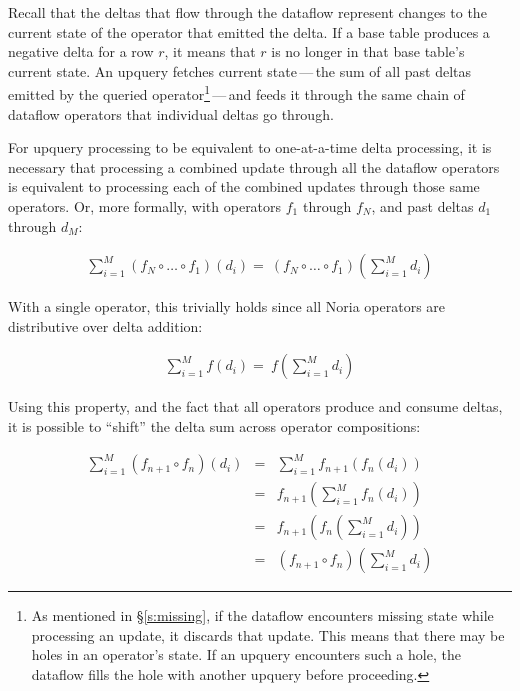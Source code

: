 Recall that the deltas that flow through the dataflow represent changes to the
current state of the operator that emitted the delta. If a base table produces
a negative delta for a row $r$, it means that $r$ is no longer in that base
table's current state. An upquery fetches current state\,---\,the sum of all
past deltas emitted by the queried operator\footnote{As mentioned in
\S\ref{s:missing}, if the dataflow encounters missing state while processing an
update, it discards that update. This means that there may be holes in an
operator's state. If an upquery encounters such a hole, the dataflow fills the
hole with another upquery before proceeding.}\,---\,and feeds it through the
same chain of dataflow operators that individual deltas go through.

For upquery processing to be equivalent to one-at-a-time delta processing, it is
necessary that processing a combined update through all the dataflow operators
is equivalent to processing each of the combined updates through those same
operators. Or, more formally, with operators $f_1$ through $f_N$, and past
deltas $d_1$ through $d_M$:

\begin{eqnarray*}
  \sum^M_{i=1}\left(f_N \circ \dots \circ f_1\right)\left(d_i\right) = \
  \left(f_N \circ \dots \circ f_1\right)\left(\sum^M_{i=1}d_i\right)
\end{eqnarray*}

With a single operator, this trivially holds since all Noria operators are
distributive over delta addition:

\begin{eqnarray*}
  \sum^M_{i=1}f\left(d_i\right) = \
  f\left(\sum^M_{i=1}d_i\right)
\end{eqnarray*}

Using this property, and the fact that all operators produce and consume deltas,
it is possible to ``shift'' the delta sum across operator compositions:

\begin{eqnarray*}
  \sum^M_{i=1}\left(f_{n+1} \circ f_n\right)\left(d_i\right) &=& \sum^M_{i=1}f_{n+1}\left(f_n\left(d_i\right)\right) \\
  &=& f_{n+1}\left(\sum^M_{i=1}f_n\left(d_i\right)\right) \\
  &=& f_{n+1}\left(f_n\left(\sum^M_{i=1}d_i\right)\right) \\
  &=& \left(f_{n+1} \circ f_n\right)\left(\sum^M_{i=1}d_i\right)
\end{eqnarray*}

